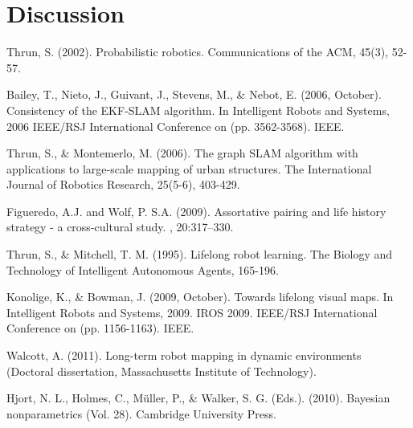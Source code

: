 \documentclass[twoside,hidelinks]{article}
\begin{document}
\section{Discussion}


\begin{thebibliography}{9}

\newblock Thrun, S. (2002). Probabilistic robotics. Communications of the ACM, 45(3), 52-57.


\newblock Bailey, T., Nieto, J., Guivant, J., Stevens, M., \& Nebot, E. (2006, October). Consistency of the EKF-SLAM algorithm. In Intelligent Robots and Systems, 2006 IEEE/RSJ International Conference on (pp. 3562-3568). IEEE.

\newblock Thrun, S., \& Montemerlo, M. (2006). The graph SLAM algorithm with applications to large-scale mapping of urban structures. The International Journal of Robotics Research, 25(5-6), 403-429.

Figueredo, A.J. and Wolf, P. S.A. (2009).
\newblock Assortative pairing and life history strategy - a cross-cultural
  study.
, 20:317--330.

\newblock Thrun, S., \& Mitchell, T. M. (1995). Lifelong robot learning. The Biology and Technology of Intelligent Autonomous Agents, 165-196.

\newblock Konolige, K., \& Bowman, J. (2009, October). Towards lifelong visual maps. In Intelligent Robots and Systems, 2009. IROS 2009. IEEE/RSJ International Conference on (pp. 1156-1163). IEEE.

\newblock Walcott, A. (2011). Long-term robot mapping in dynamic environments (Doctoral dissertation, Massachusetts Institute of Technology).

\newblock Hjort, N. L., Holmes, C., Müller, P., \& Walker, S. G. (Eds.). (2010). Bayesian nonparametrics (Vol. 28). Cambridge University Press.





\end{thebibliography}
\end{document}

